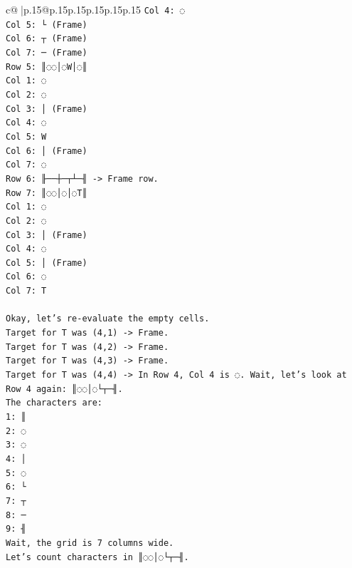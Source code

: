 \documentclass{article}
\begin{document}
{\begin{supertabular}{c@{$\;$}|p{.15\linewidth}@{}p{.15\linewidth}p{.15\linewidth}p{.15\linewidth}p{.15\linewidth}p{.15\linewidth}}
{{{\texttt{Col 4: ◌} \\
\texttt{Col 5: └ (Frame)} \\
\texttt{Col 6: ┬ (Frame)} \\
\texttt{Col 7: ─ (Frame)} \\
\texttt{Row 5: ║◌◌│◌W│◌║} \\
\texttt{Col 1: ◌} \\
\texttt{Col 2: ◌} \\
\texttt{Col 3: │ (Frame)} \\
\texttt{Col 4: ◌} \\
\texttt{Col 5: W} \\
\texttt{Col 6: │ (Frame)} \\
\texttt{Col 7: ◌} \\
\texttt{Row 6: ╟──┼─┬┴─╢ {-}> Frame row.} \\
\texttt{Row 7: ║◌◌│◌│◌T║} \\
\texttt{Col 1: ◌} \\
\texttt{Col 2: ◌} \\
\texttt{Col 3: │ (Frame)} \\
\texttt{Col 4: ◌} \\
\texttt{Col 5: │ (Frame)} \\
\texttt{Col 6: ◌} \\
\texttt{Col 7: T} \\
\\ 
\texttt{Okay, let's re{-}evaluate the empty cells.} \\
\texttt{Target for T was (4,1) {-}> Frame.} \\
\texttt{Target for T was (4,2) {-}> Frame.} \\
\texttt{Target for T was (4,3) {-}> Frame.} \\
\texttt{Target for T was (4,4) {-}> In Row 4, Col 4 is ◌. Wait, let's look at Row 4 again: ║◌◌│◌└┬─╢.} \\
\texttt{The characters are:} \\
\texttt{1: ║} \\
\texttt{2: ◌} \\
\texttt{3: ◌} \\
\texttt{4: │} \\
\texttt{5: ◌} \\
\texttt{6: └} \\
\texttt{7: ┬} \\
\texttt{8: ─} \\
\texttt{9: ╢} \\
\texttt{Wait, the grid is 7 columns wide.} \\
\texttt{Let's count characters in ║◌◌│◌└┬─╢.} \\
}}}
\end{supertabular}}
\end{document}
